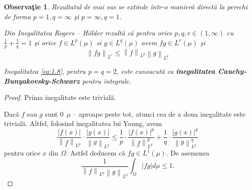 \documentclass[a4paper,12pt,oneside]{report}
\newtheorem{remark}{Observa\c{t}ie}
\begin{document}
\begin{remark}
  Rezultatul de mai sus se extinde \^{i}ntr-o manier\u{a} direct\u{a} la perechi de forma \(p = 1, q = \infty\) \c{s}i \(p = \infty, q = 1\).

Din Inegalitatea Rogers – Hölder rezult\u{a} c\u{a} pentru orice \(p, q, r \in \left ( 1 , \infty  \right )\) cu \(\frac{1}{p} + \frac{1}{q} = 1\) \c{s}i orice \(f\in L^{p}\left ( \mu  \right )\) si \(g\in L^{q}\left ( \mu  \right )\) avem \(fg\in L^{r}\left ( \mu  \right )\) \c{s}i
\begin{displaymath}
  \left \| fg \right \|_{L^{r}}\leq \left \| f \right \|_{L^{p}}\left \| g \right \|_{L^{q}} \label{eq:1.8} \tag{1.8}
\end{displaymath}


Inegalitatea \ref{eq:1.8}, pentru \(p = q = 2\), este cunoscut\u{a} ca \textbf{inegalitatea Cauchy-Bunyakovsky-Schwarz} pentru integrale.
\end{remark}
\begin{proof}
Prima inegalitate este trivial\u{a}.

Dac\u{a} \(f\) sau \(g\) sunt \(0~~ \mu\) – aproape peste tot, atunci cea de a doua inegalitate este trivial\u{a}. Altfel, folosind inegalitatea lui Young, avem
\begin{displaymath}
  \frac{\left | f\left ( x \right ) \right |}{\left \| f \right \|_{L^{p}}} \cdot \frac{\left | g\left ( x \right ) \right |}{\left \| g \right \|_{L^{q}}}\leq \frac{1}{p}\cdot \frac{\left | f\left ( x \right ) \right |^{p}}{\left \| f \right \|^{p}_{L^{p}}} + \frac{1}{q}\cdot \frac{\left | g\left ( x \right ) \right |^{q}}{\left \| g \right \|^{q}_{L^{q}}}
\end{displaymath}
 pentru orice \(x\) din \(\Omega\). Astfel deducem c\u{a} \(fg \in L^{1}\left ( \mu  \right )\). De asemenea
\begin{displaymath}
  \frac{1}{\left \| f \right \|_{L^{p}}\left \| g \right \|_{L^{q}}}\int_{\Omega }\left | fg \right |d\mu \leq 1.
\end{displaymath}
\end{proof}
\end{document}
